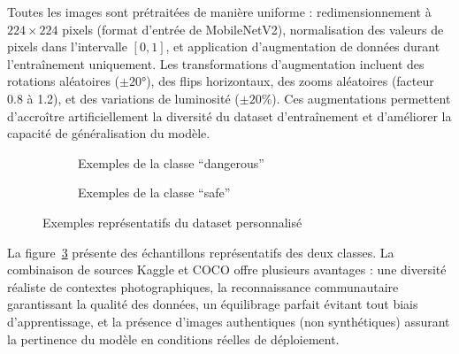 Toutes les images sont prétraitées de manière uniforme : redimensionnement à $224 \times 224$ pixels (format d'entrée de MobileNetV2), normalisation des valeurs de pixels dans l'intervalle $[0, 1]$, et application d'augmentation de données durant l'entraînement uniquement. Les transformations d'augmentation incluent des rotations aléatoires ($\pm 20°$), des flips horizontaux, des zooms aléatoires (facteur 0.8 à 1.2), et des variations de luminosité ($\pm 20\%$). Ces augmentations permettent d'accroître artificiellement la diversité du dataset d'entraînement et d'améliorer la capacité de généralisation du modèle.


\begin{figure}[H]
    \centering
    \begin{subfigure}[b]{0.48\textwidth}
        \centering
        \caption{Exemples de la classe ``dangerous''}
        \label{fig:dataset_dangerous}
    \end{subfigure}
    \hfill
    \begin{subfigure}[b]{0.48\textwidth}
        \centering
        \caption{Exemples de la classe ``safe''}
        \label{fig:dataset_safe}
    \end{subfigure}
    \caption{Exemples représentatifs du dataset personnalisé}
    \label{fig:dataset_examples}
\end{figure}

La figure~\ref{fig:dataset_examples} présente des échantillons représentatifs des deux classes. La combinaison de sources Kaggle et COCO offre plusieurs avantages : une diversité réaliste de contextes photographiques, la reconnaissance communautaire garantissant la qualité des données, un équilibrage parfait évitant tout biais d'apprentissage, et la présence d'images authentiques (non synthétiques) assurant la pertinence du modèle en conditions réelles de déploiement.